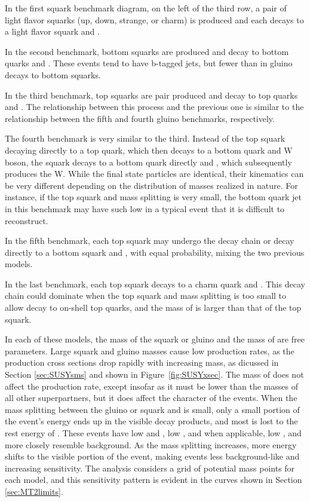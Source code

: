     In the first squark benchmark diagram, on the left of the third row, a pair of light flavor squarks (up, down, strange, or charm) is produced and each decays to a light flavor squark and \lsp.
   
    In the second benchmark, bottom squarks are produced and decay to bottom quarks and \lsp.
    These events tend to have b-tagged jets, but fewer than in gluino decays to bottom squarks.

    In the third benchmark, top squarks are pair produced and decay to top quarks and \lsp.
    The relationship between this process and the previous one is similar to the relationship between the fifth and fourth gluino benchmarks, respectively.

    The fourth benchmark is very similar to the third.
    Instead of the top squark decaying directly to a top quark, which then decays to a bottom quark and W boson, the squark decays to a bottom quark directly and \chargino, which subsequently produces the W.
    While the final state particles are identical, their kinematics can be very different depending on the distribution of masses realized in nature.
    For instance, if the top squark and \chargino mass splitting is very small, the bottom quark jet in this benchmark may have such low \pt in a typical event that it is difficult to reconstruct.

    In the fifth benchmark, each top squark may undergo the \chargino decay chain or decay directly to a bottom squark and \lsp, with equal probability, mixing the two previous models.

    In the last benchmark, each top squark decays to a charm quark and \lsp.
    This decay chain could dominate when the top squark and \lsp mass splitting is too small to allow decay to on-shell top quarks, and the mass of \chargino is larger than that of the top squark.

    In each of these models, the mass of the squark or gluino and the mass of \lsp are free parameters.
    Large squark and gluino masses cause low production rates, as the production cross sections drop rapidly with increasing mass, as dicussed in Section \ref{sec:SUSYsms} and shown in Figure~\ref{fig:SUSYxsec}.
    The mass of \lsp does not affect the production rate, except insofar as it must be lower than the masses of all other superpartners, but it does affect the character of the events.
    When the mass splitting between the gluino or squark and \lsp is small, only a small portion of the event's energy ends up in the visible decay products, and most is lost to the rest energy of \lsp.
    These events have low \Ht and \met, low \njet, and when applicable, low \nb, and more closely resemble background.
    As the mass splitting increases, more energy shifts to the visible portion of the event, making events less background-like and increasing sensitivity.
    The analysis considers a grid of potential mass points for each model, and this sensitivity pattern is evident in the curves shown in Section \ref{sec:MT2limits}.
    
